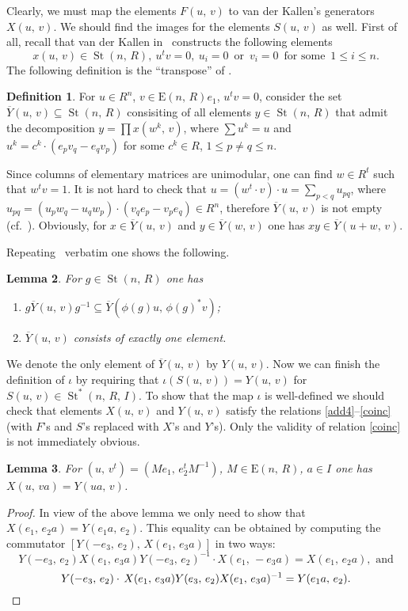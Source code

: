 \documentclass[11pt]{amsart}
\theoremstyle{plain} \declaretheorem[name=Theorem, Refname={Theorem,Theorems}]{tm} \Crefname{tm}{Theorem}{Theorems}
\numberwithin{equation}{section}
\newtheorem{lm}{Lemma} \numberwithin{lm}{section} \Crefname{lm}{Lemma}{Lemmas}
\theoremstyle{definition} \newtheorem{df}[lm]{Definition} \Crefname{df}{Definition}{Definitions}
\theoremstyle{remark} \newtheorem{rk}[lm]{Remark} \Crefname{rk}{Remark}{Remarks}
\newcommand{\E}{{\mathrm{E}}}
\newcommand{\St}{\mathop{\mathrm{St}}\nolimits}
\newcommand{\inv}{^{-1}}
\begin{document}
Clearly, we must map the elements $F(u,\,v)$ to van der Kallen's generators $X(u,\,v)$.
We should find the images for the elements $S(u,\,v)$ as well.
First of all, recall that van der Kallen in~\cite[3.8--3.10]{vdK} constructs the following elements
$$x(u,\,v)\in\St(n,\,R),\ u^tv=0,\ u_i=0\,\text{ or }\,v_i=0\,\text{ for some }\,1\leq i\leq n.$$
The following definition is the ``transpose'' of \cite[3.13]{vdK}.
\begin{df} For $u\in R^n$, $v\in\E(n,\,R)e_1$, $u^tv=0$, consider the set $\overline Y(u,\,v)\subseteq\St(n,\,R)$
 consisiting of all elements $y\in\St(n,\,R)$ that admit the decomposition $y=\prod x(w^k,\,v)$, 
 where $\sum u^k=u$ and $u^k=c^k \cdot (e_pv_q-e_qv_p)$ for some $c^k\in R$, $1\leq p\neq q\leq n$. \end{df}

Since columns of elementary matrices are unimodular, one can find $w\in R^t$ such that $w^tv=1$.
It is not hard to check that $u = (w^t\cdot v)\cdot u = \sum_{p<q}u_{pq}$, where $u_{pq} = (u_pw_q - u_qw_p) \cdot (v_qe_p - v_pe_q)\in{}\!R^n$,
therefore $\overline Y(u,\,v)$ is not empty (cf.~\cite[3.1--3.2]{vdK}).
Obviously, for $x\in\overline Y(u,\,v)$ and $y\in\overline Y(w,\,v)$ one has $xy\in\overline Y(u+w,\,v)$.

Repeating~\cite[3.14--3.15]{vdK} verbatim one shows the following.
\begin{lm} For $g\in\St(n,\,R)$ one has
\begin{enumerate} \item $g\overline Y(u,\,v)g\inv\subseteq\overline Y(\phi(g)u,\,\phi(g)^*v)$;
                  \item $\overline Y(u,\,v)$ consists of exactly one element. \end{enumerate} \end{lm}

We denote the only element of $\overline Y(u,\,v)$ by $Y(u,\,v)$. 
Now we can finish the definition of $\iota$ by requiring that $\iota(S(u,\,v)) = Y(u,\,v)$ for $S(u,\,v)\in\St^*(n,\,R,\,I)$. 
To show that the map $\iota$ is well-defined we should check that elements $X(u,\,v)$ and $Y(u,\,v)$ satisfy the relations 
\eqref{add4}--\eqref{coinc} (with $F$'s and $S$'s replaced with $X$'s and $Y$'s).
Only the validity of relation \eqref{coinc} is not immediately obvious.
\begin{lm} \label{lm:XY} For $(u,\,v^t)=(Me_1,\,e_2^tM\inv)$, $M\in\E(n,\,R)$, $a\in I$ one has $X(u,\,va)=Y(ua,\,v)$. \end{lm}
\begin{proof}
In view of the above lemma we only need to show that $X(e_1,\,e_2a)=Y(e_1a,\,e_2)$.
This equality can be obtained by computing the commutator $[Y(-e_3,\,e_2),\,X(e_1,\,e_3a)]$ in two ways:
$$ Y(-e_3,\,e_2)X(e_1,\,e_3a)Y(-e_3,\,e_2)\inv\cdot X(e_1,\,-e_3a)=X(e_1,\,e_2a), \text{ and} $$
$$ Y(-e_3,\,e_2)\cdot\,X(e_1,\,e_3a)Y(e_3,\,e_2)X(e_1,\,e_3a)\inv=Y(e_1a,\,e_2). \qedhere $$
\end{proof}
\end{document}
